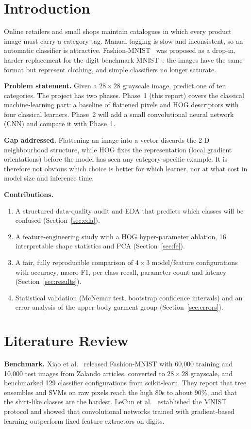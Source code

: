 \documentclass[conference]{IEEEtran}
\begin{document}
\section{Introduction}
Online retailers and small shops maintain catalogues in which every product image must carry a category tag. Manual tagging is slow and inconsistent, so an automatic classifier is attractive. Fashion-MNIST~\cite{xiao2017} was proposed as a drop-in, harder replacement for the digit benchmark MNIST~\cite{lecun1998}: the images have the same format but represent clothing, and simple classifiers no longer saturate.

\textbf{Problem statement.} Given a $28\times28$ grayscale image, predict one of ten categories. The project has two phases. Phase~1 (this report) covers the classical machine-learning part: a baseline of flattened pixels and HOG descriptors with four classical learners. Phase~2 will add a small convolutional neural network (CNN) and compare it with Phase~1.

\textbf{Gap addressed.} Flattening an image into a vector discards the 2-D neighbourhood structure, while HOG fixes the representation (local gradient orientations) before the model has seen any category-specific example. It is therefore not obvious which choice is better for which learner, nor at what cost in model size and inference time.

\textbf{Contributions.}
\begin{enumerate}
\item A structured data-quality audit and EDA that predicts which classes will be confused (Section~\ref{sec:eda}).
\item A feature-engineering study with a HOG hyper-parameter ablation, 16 interpretable shape statistics and PCA (Section~\ref{sec:fe}).
\item A fair, fully reproducible comparison of $4\times3$ model/feature configurations with accuracy, macro-F1, per-class recall, parameter count and latency (Section~\ref{sec:results}).
\item Statistical validation (McNemar test, bootstrap confidence intervals) and an error analysis of the upper-body garment group (Section~\ref{sec:errors}).
\end{enumerate}

\section{Literature Review}
\textbf{Benchmark.} Xiao et al.~\cite{xiao2017} released Fashion-MNIST with 60{,}000 training and 10{,}000 test images from Zalando articles, converted to $28\times28$ grayscale, and benchmarked 129 classifier configurations from scikit-learn. They report that tree ensembles and SVMs on raw pixels reach the high 80s to about 90\%, and that the shirt-like classes are the hardest. LeCun et al.~\cite{lecun1998} established the MNIST protocol and showed that convolutional networks trained with gradient-based learning outperform fixed feature extractors on digits.
\end{document}
